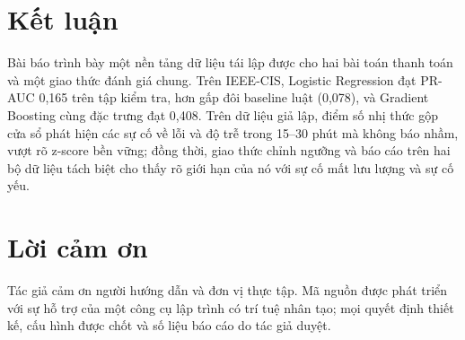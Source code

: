 \documentclass[11pt,a4paper]{article}
\theoremstyle{definition}
\theoremstyle{remark}
\numberwithin{equation}{section}
\begin{document}
\section{Kết luận}
Bài báo trình bày một nền tảng dữ liệu tái lập được cho hai bài toán thanh toán và một giao thức đánh giá chung. Trên IEEE-CIS, Logistic Regression đạt PR-AUC 0,165 trên tập kiểm tra, hơn gấp đôi baseline luật (0,078), và Gradient Boosting cùng đặc trưng đạt 0,408. Trên dữ liệu giả lập, điểm số nhị thức gộp cửa sổ phát hiện các sự cố về lỗi và độ trễ trong 15--30 phút mà không báo nhầm, vượt rõ z-score bền vững; đồng thời, giao thức chỉnh ngưỡng và báo cáo trên hai bộ dữ liệu tách biệt cho thấy rõ giới hạn của nó với sự cố mất lưu lượng và sự cố yếu.

\section*{Lời cảm ơn}
Tác giả cảm ơn người hướng dẫn và đơn vị thực tập. Mã nguồn được phát triển với sự hỗ trợ của một công cụ lập trình có trí tuệ nhân tạo; mọi quyết định thiết kế, cấu hình được chốt và số liệu báo cáo do tác giả duyệt.
\end{document}
